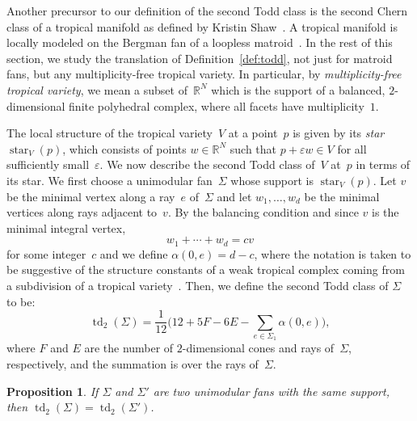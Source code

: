\documentclass[11pt]{amsart}
\newtheorem{prop}[thm]{Proposition}
\theoremstyle{definition}
\newcommand{\defi}[1]{\emph{#1}}
\newcommand{\RR}{\mathbb R}
\newcommand{\td}{\operatorname{td}}
\begin{document}
Another precursor to our definition of the second Todd class is 
the second Chern class of a tropical manifold as defined by Kristin
Shaw~\cite[Def.~3.2.14]{shaw}. A tropical manifold is locally modeled on the
Bergman fan of a loopless matroid~\cite{ardila-klivans}.  In the rest of this
section, we study the translation of Definition~\ref{def:todd}, not just for
matroid fans, but any multiplicity-free tropical variety.
In particular, by \defi{multiplicity-free tropical variety}, we mean a subset
of~$\RR^N$ which is the support of a balanced, $2$-dimensional finite polyhedral
complex, where all facets have multiplicity~$1$. 

The local structure of the tropical variety~$V$ at a point~$p$ is given by its
\defi{star} $\operatorname{star}_V(p)$, which consists of points $w \in \RR^N$ such that $p + \varepsilon w
\in V$ for all sufficiently small~$\varepsilon$. We now describe the second Todd class
of~$V$ at~$p$ in terms of its star. We first choose a unimodular fan~$\Sigma$
whose support is $\operatorname{star}_V(p)$. Let $v$ be the minimal
vertex along a ray~$e$ of~$\Sigma$ and let $w_1, \ldots, w_d$ be the
minimal vertices along rays adjacent to~$v$. By the balancing condition and
since $v$ is the minimal integral vertex,
\begin{equation}\label{eq:star-relation}
w_1 + \cdots + w_d = c v
\end{equation}
for some integer~$c$ and we define $\alpha(0, e) = d - c$, where the notation is
taken to be suggestive of the structure constants of a weak tropical complex
coming from a subdivision of a tropical
variety~\cite[Const.~3.3]{cartwright-complexes}.
Then, we define the second Todd
class of $\Sigma$ to be:
\begin{equation}\label{eq:todd-fan}
\td_2(\Sigma) = \frac{1}{12} \Bigg(12 + 5 F - 6 E - \sum_{e \in \Sigma_1}
\alpha(0, e) \Bigg),
\end{equation}
where $F$ and $E$ are the number of $2$-dimensional cones and rays of~$\Sigma$,
respectively, and the summation is over the rays of~$\Sigma$.

\begin{prop}\label{prop:invariance}
If $\Sigma$ and $\Sigma'$ are two unimodular fans with the same support, then
$\td_2(\Sigma) = \td_2(\Sigma')$.
\end{prop}
\end{document}
